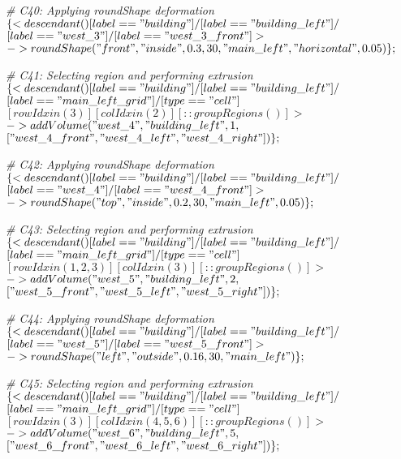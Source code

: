 \noindent \textit{\# C40: Applying roundShape deformation}\\
$\{< descendant() [label=="building"] / [label=="building\_left"] / $\\
$[label=="west\_3"] / [label=="west\_3\_front"] > $\\
$-> roundShape("front", "inside", 0.3, 30, "main\_left", "horizontal", 0.05)\};$

\noindent \textit{\# C41: Selecting region and performing extrusion}\\
$\{< descendant() [label=="building"] / [label=="building\_left"] / $\\
$[label=="main\_left\_grid"] / [type=="cell"] $\\
$[rowIdx in (3)] [colIdx in (2)] [::groupRegions()] > $\\
$-> addVolume("west\_4", "building\_left", 1, $\\
$["west\_4\_front", "west\_4\_left", "west\_4\_right"])\};$

\noindent \textit{\# C42: Applying roundShape deformation}\\
$\{< descendant() [label=="building"] / [label=="building\_left"] / $\\
$[label=="west\_4"] / [label=="west\_4\_front"] > $\\
$-> roundShape("top", "inside", 0.2, 30, "main\_left", 0.05)\};$

\noindent \textit{\# C43: Selecting region and performing extrusion}\\
$\{< descendant() [label=="building"] / [label=="building\_left"] / $\\
$[label=="main\_left\_grid"] / [type=="cell"] $\\
$[rowIdx in (1, 2, 3)] [colIdx in (3)] [::groupRegions()] > $\\
$-> addVolume("west\_5", "building\_left", 2, $\\
$["west\_5\_front", "west\_5\_left", "west\_5\_right"])\};$

\noindent \textit{\# C44: Applying roundShape deformation}\\
$\{< descendant() [label=="building"] / [label=="building\_left"] / $\\
$[label=="west\_5"] / [label=="west\_5\_front"] > $\\
$-> roundShape("left", "outside", 0.16, 30, "main\_left")\};$

\noindent \textit{\# C45: Selecting region and performing extrusion}\\
$\{< descendant() [label=="building"] / [label=="building\_left"] / $\\
$[label=="main\_left\_grid"] / [type=="cell"] $\\
$[rowIdx in (3)] [colIdx in (4, 5, 6)] [::groupRegions()] > $\\
$-> addVolume("west\_6", "building\_left", 5, $\\
$["west\_6\_front", "west\_6\_left", "west\_6\_right"])\};$

